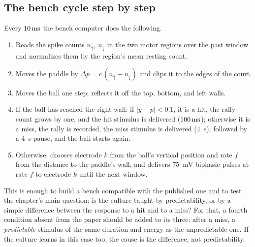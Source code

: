 \subsection*{The bench cycle step by step}

Every $10\,\text{ms}$ the bench computer does the following.
\begin{enumerate}
\item Reads the spike counts $n_\uparrow$, $n_\downarrow$ in the two motor regions over the past window and normalizes them by the region's mean resting count.
\item Moves the paddle by $\Delta p=c\,(n_\uparrow-n_\downarrow)$ and clips it to the edges of the court.
\item Moves the ball one step; reflects it off the top, bottom, and left walls.
\item If the ball has reached the right wall: if $|y-p|<0.1$, it is a hit, the rally count grows by one, and the hit stimulus is delivered ($100\,\text{ms}$); otherwise it is a miss, the rally is recorded, the miss stimulus is delivered ($4$~s), followed by a $4$~s pause, and the ball starts again.
\item Otherwise, chooses electrode $k$ from the ball's vertical position and rate $f$ from the distance to the paddle's wall, and delivers $75$~mV biphasic pulses at rate $f$ to electrode $k$ until the next window.
\end{enumerate}
This is enough to build a bench compatible with the published one and to test the chapter's main question: is the culture taught by predictability, or by a simple difference between the response to a hit and to a miss? For that, a fourth condition absent from the paper should be added to its three: after a miss, a \emph{predictable} stimulus of the same duration and energy as the unpredictable one. If the culture learns in this case too, the cause is the difference, not predictability.
